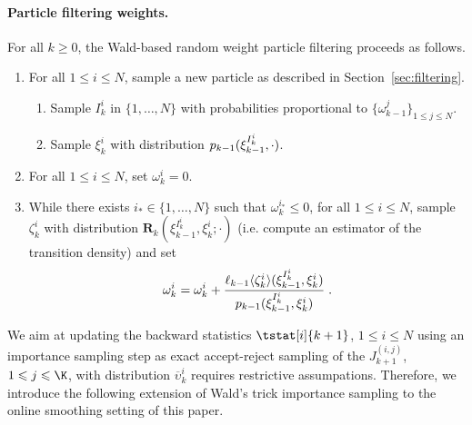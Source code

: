 \documentclass{article}
\newcommand{\N}{N}
\newcommand{\bi}[3]{J_{#1}^{(#2, #3)}}
\newcommand{\kissforward}[3][]
{\ifthenelse{\equal{#1}{}}{p_{#2}}
{\ifthenelse{\equal{#1}{fully}}{p^{\star}_{#2}}
{\ifthenelse{\equal{#1}{smooth}}{\tilde{r}_{#2}}{\mathrm{erreur}}}}}
\newcommand{\adjfuncforward}[1]{\vartheta_{#1}}
\newcommand{\eqsp}{\;}
\newcommand{\ewght}[2]{\ensuremath{\omega_{#1}^{#2}}}
\newcommand{\epart}[2]{\ensuremath{\xi_{#1}^{#2}}}
\newcommand{\kernelmarg}{\mathbf{R}}
\newcommand{\hatqg}[1]{\mathsf{\ell}_{#1}}
\begin{document}
\paragraph{Particle filtering weights.}  
For all $k\geqslant 0$, the Wald-based random weight particle filtering proceeds as follows.
\begin{enumerate}
\item For all $1\leqslant i\leqslant \N$, sample a new particle as described in Section~\ref{sec:filtering}.
\begin{enumerate}
\item Sample $I_k^{i}$ in $\{1,\ldots,\N\}$ with probabilities proportional to $\{\ewght{k-1}{j} 
\}_{1\leqslant j\leqslant \N}$.
\item Sample $\epart{k}{i}$ with distribution $\kissforward{k-1}{k-1}(\epart{k-1}{I_k^{i}},\cdot)$.
\end{enumerate}
\item For all $1\leqslant i\leqslant \N$, set  $\ewght{k}{i}= 0$.
\item While there exists $i_* \in\{1,\ldots,\N\}$ such that $\ewght{k}{i_*} \leqslant 0$, for all $1\leqslant i\leqslant \N$, sample $\zeta_k^{i}$ with distribution $\kernelmarg_{k}(\epart{k-1}{I_k^{i}},\epart{k}{i};\cdot)$ (i.e. compute an estimator of the transition density) and set 
$$
\ewght{k}{i}  = \ewght{k}{i} + \frac{\hatqg{k-1}\langle \zeta_k^i\rangle(\epart{k-1}{I_k^{i}},\epart{k}{i}) }{\kissforward{k-1}{k-1}(\epart{k-1}{I_k^{i}},\epart{k}{i})}\eqsp.
$$
\end{enumerate}
We aim at updating the backward statistics $\tstat[i]{k+1}$, $1\leqslant i \leqslant N$ using an importance sampling step as exact accept-reject sampling of the $\bi{k+1}{i}{j}$, $1\leqslant j \leqslant \K$,  with distribution $\overline \upsilon_k^i$ requires restrictive assumpations. Therefore, we introduce the following extension of Wald's trick importance sampling to the online smoothing setting of this paper.
\end{document}
